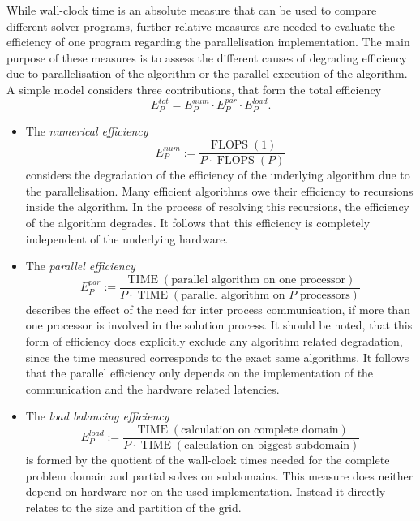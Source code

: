 While wall-clock time is an absolute measure that can be used to compare different solver programs, further relative measures are needed to evaluate the efficiency of one program regarding the parallelisation implementation. The main purpose of these measures is to assess the different causes of degrading efficiency due to parallelisation of the algorithm or the parallel execution of the algorithm. A simple model \cite{ferziger02,schaefer99} considers three contributions, that form the total efficiency
\begin{displaymath}
  E^{tot}_P = E^{num}_P \cdot E^{par}_P \cdot E^{load}_P.
\end{displaymath}
\begin{itemize}
  \item[] The \emph{numerical efficiency}
  \begin{displaymath} E^{num}_P := \frac{\operatorname{FLOPS}(1)}{P \cdot \operatorname{FLOPS}(P)}\end{displaymath} 
    considers the degradation of the efficiency of the underlying algorithm due to the parallelisation. Many efficient algorithms owe their efficiency to recursions inside the algorithm. In the process of resolving this recursions, the efficiency of the algorithm degrades. It follows that this efficiency is completely independent of the underlying hardware.
  \item[] The \emph{parallel efficiency}
    \begin{displaymath} E^{par}_P :=\frac{\operatorname{TIME}(\text{parallel algorithm on one processor})}{P \cdot \operatorname{TIME}(\text{parallel algorithm on \(P\) processors})} \end{displaymath} 
      describes the effect of the need for inter process communication, if more than one processor is involved in the solution process. It should be noted, that this form of efficiency does explicitly exclude any algorithm related degradation, since the time measured corresponds to the exact same algorithms. It follows that the parallel efficiency only depends on the implementation of the communication and the hardware related latencies.
  \item[] The \emph{load balancing efficiency} 
    \begin{displaymath} E^{load}_P :=\frac{\operatorname{TIME}(\text{calculation on complete domain})}{P \cdot \operatorname{TIME}(\text{calculation on biggest subdomain})} \end{displaymath}
       is formed by the quotient of the wall-clock times needed for the complete problem domain and partial solves on subdomains. This measure does neither depend on hardware nor on the used implementation. Instead it directly relates to the size and partition of the grid. 
\end{itemize}

